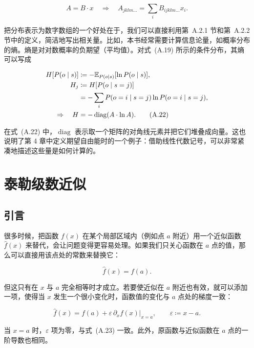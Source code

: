 \begin{equation}
A = B \cdot x
\quad\Rightarrow\quad
A_{jklm\ldots} = \sum_i B_{ijklm\ldots} x_i.
\tag{A.21}
\end{equation}

把分布表示为数字数组的一个好处在于，我们可以直接利用第~A.2.1 节和第~A.2.2 节中的定义，简洁地写出相关量。比如，本书经常需要计算信息论量，如概率分布的熵。熵是对对数概率的负期望（平均值）。对式~(A.19) 所示的条件分布，其熵可以写成

\begin{align}
H[P(o\mid s)] &\coloneqq -\mathbb{E}_{P(o\mid s)}[\ln P(o\mid s)], \notag \\
H_j &\coloneqq H[P(o\mid s=j)] \notag \\
&= - \sum_i P(o=i\mid s=j)\ln P(o=i\mid s=j), \notag \\
\Rightarrow\quad
H &= -\operatorname{diag}(A \cdot \ln A).
\tag{A.22}
\end{align}

在式~(A.22) 中，$\operatorname{diag}$ 表示取一个矩阵的对角线元素并把它们堆叠成向量。这也说明了第 4 章中定义期望自由能时的一个例子：借助线性代数记号，可以非常紧凑地描述这些量是如何计算的。

\section{泰勒级数近似}

\subsection{引言}

很多时候，把函数 $f(x)$ 在某个局部区域内（例如点 $a$ 附近）用一个近似函数 $\hat f(x)$ 来替代，会让问题变得更容易处理。如果我们只关心函数在 $a$ 点的值，那么可以直接用该点处的常数来替换它：

\begin{equation}
\hat f(x) = f(a).
\tag{A.23}
\end{equation}

但这只有在 $x$ 与 $a$ 完全相等时才成立。若要使近似在 $a$ 附近也有效，就可以添加一项，使得当 $x$ 发生一个很小变化时，函数值的变化与 $a$ 点处的梯度一致：

\begin{equation}
\hat f(x) = f(a) + \varepsilon \, \partial_x f(x)\big|_{x=a},
\qquad
\varepsilon \coloneqq x-a.
\tag{A.24}
\end{equation}

当 $x=a$ 时，$\varepsilon$ 项为零，与式~(A.23) 一致。此外，原函数与近似函数在 $a$ 点的一阶导数也相同。

